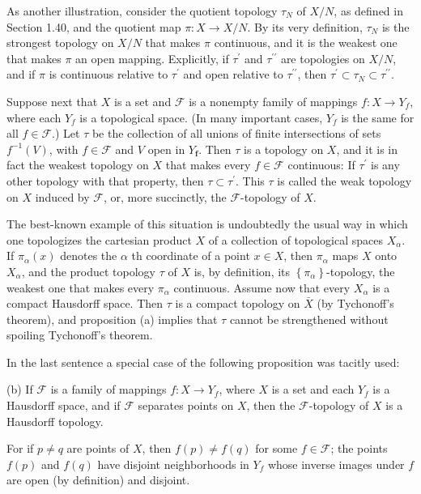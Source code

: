 \documentclass[10pt]{article}
\begin{document}
As another illustration, consider the quotient topology $\tau_{N}$ of $X / N$, as defined in Section 1.40, and the quotient map $\pi: X \rightarrow X / N$. By its very definition, $\tau_{N}$ is the strongest topology on $X / N$ that makes $\pi$ continuous, and it is the weakest one that makes $\pi$ an open mapping. Explicitly, if $\tau^{\prime}$ and $\tau^{\prime \prime}$ are topologies on $X / N$, and if $\pi$ is continuous relative to $\tau^{\prime}$ and open relative to $\tau^{\prime \prime}$, then $\tau^{\prime} \subset \tau_{N} \subset \tau^{\prime \prime}$.

Suppose next that $X$ is a set and $\mathscr{F}$ is a nonempty family of mappings $f: X \rightarrow Y_{f}$, where each $Y_{f}$ is a topological space. (In many important cases, $Y_{f}$ is the same for all $f \in \mathscr{F}$.) Let $\tau$ be the collection of all unions of finite intersections of sets $f^{-1}(V)$, with $f \in \mathscr{F}$ and $V$ open in $Y_{\boldsymbol{f}}$. Then $\tau$ is a topology on $X$, and it is in fact the weakest topology on $X$ that makes every $f \in \mathscr{F}$ continuous: If $\tau^{\prime}$ is any other topology with that property, then $\tau \subset \tau^{\prime}$. This $\tau$ is called the weak topology on $X$ induced by $\mathscr{F}$, or, more succinctly, the $\mathscr{F}$-topology of $X$.

The best-known example of this situation is undoubtedly the usual way in which one topologizes the cartesian product $X$ of a collection of topological spaces $X_{\alpha}$. If $\pi_{\alpha}(x)$ denotes the $\alpha$ th coordinate of a point $x \in X$, then $\pi_{\alpha}$ maps $X$ onto $X_{\alpha}$, and the product topology $\tau$ of $X$ is, by definition, its $\left\{\pi_{\alpha}\right\}$-topology, the weakest one that makes every $\pi_{\alpha}$ continuous. Assume now that every $X_{\alpha}$ is a compact Hausdorff space. Then $\tau$ is a compact topology on $\bar{X}$ (by Tychonoff's theorem), and proposition (a) implies that $\tau$ cannot be strengthened without spoiling Tychonoff's theorem.

In the last sentence a special case of the following proposition was tacitly used:

(b) If $\mathscr{F}$ is a family of mappings $f: X \rightarrow Y_{f}$, where $X$ is a set and each $Y_{f}$ is a Hausdorff space, and if $\mathscr{F}$ separates points on $X$, then the $\mathscr{F}$-topology of $X$ is a Hausdorff topology.

For if $p \neq q$ are points of $X$, then $f(p) \neq f(q)$ for some $f \in \mathscr{F}$; the points $f(p)$ and $f(q)$ have disjoint neighborhoods in $Y_{f}$ whose inverse images under $f$ are open (by definition) and disjoint.
\end{document}
